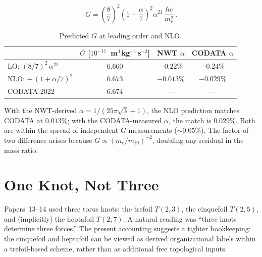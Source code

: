 \documentclass[11pt]{article}
\begin{document}
\begin{equation}
\label{eq:G}
\boxed{
  G = \left(\frac{8}{7}\right)^{\!2}
  \left(1 + \frac{\alpha}{7}\right)^{\!2}
  \alpha^{21}\,\frac{\hbar c}{m_e^2}\,.
}
\end{equation}

\begin{table}[h]
\centering
\caption{Predicted $G$ at leading order and NLO.}
\label{tab:G}
\begin{tabular}{lccc}
\toprule
 & $G$ [$10^{-11}$~m$^3$\,kg$^{-1}$\,s$^{-2}$]
 & NWT $\alpha$ & CODATA $\alpha$ \\
\midrule
LO: $(8/7)^2\,\alpha^{21}$ & $6.660$ & $-0.22\%$ & $-0.24\%$ \\
NLO: $+\,(1{+}\alpha/7)^2$ & $6.673$ & $\mathbf{-0.013\%}$
  & $-0.029\%$ \\
CODATA 2022 & $6.674$ & --- & --- \\
\bottomrule
\end{tabular}
\end{table}

\noindent With the NWT-derived $\alpha = 1/(25\pi\sqrt{3}+1)$,
the NLO prediction matches CODATA at $0.013\%$; with the
CODATA-measured $\alpha$, the match is $0.029\%$.  Both are
within the spread of independent $G$ measurements ($\sim 0.05\%$).
The factor-of-two difference arises because
$G \propto (m_e/m_\text{Pl})^{-2}$, doubling any residual in
the mass ratio.


\section{One Knot, Not Three}
\label{sec:one-knot}

Papers~13--14 used three torus knots: the trefoil $T(2,3)$, the
cinquefoil $T(2,5)$, and (implicitly) the heptafoil $T(2,7)$.
A natural reading was ``three knots determine three forces.''
The present accounting suggests a tighter bookkeeping: the
cinquefoil and heptafoil can be viewed as derived organizational
labels within a trefoil-based scheme, rather than as additional
free topological inputs.
\end{document}
